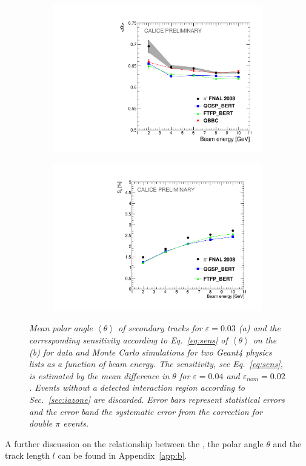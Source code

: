 \begin{figure}[H]
	\centering
	\begin{subfigure}{0.5\textwidth}
		\centering
		\includegraphics[width=.90\linewidth]{ECAL/plots/theta-graph.pdf}
		\caption{\label{fig:thetagraph}}
	\end{subfigure}%
	\begin{subfigure}{0.5\textwidth}
		\centering
		\includegraphics[width=.90\linewidth]{ECAL/plots/delta-theta-graph.pdf}
		\caption{\label{fig:dthetagraph} }
	\end{subfigure}
	\caption{\label{fig:fullthetagraph} \sl Mean polar angle $\left<\theta\right>$ of secondary tracks for $\varepsilon = 0.03$  (a) and the corresponding sensitivity according to Eq.~\ref{eq:sens} of $\left<\theta\right>$ on the \ep\,(b) for data and Monte Carlo simulations for two {\sc Geant}4 physics lists as a function of beam energy. The sensitivity, see Eq.~\ref{eq:sens}, is estimated by the mean difference in $\theta$ for $\varepsilon = 0.04$ and $\varepsilon_{nom} = 0.02$. Events without a detected interaction region according to Sec.~\ref{sec:iazone} are discarded. Error bars represent statistical errors and the error band the systematic error from the correction for double $\pi$ events.}
\end{figure}
A further discussion on the relationship between the \ep ,  the polar angle $\theta$ and the track length $l$ can be found in Appendix~\ref{app:b}.

